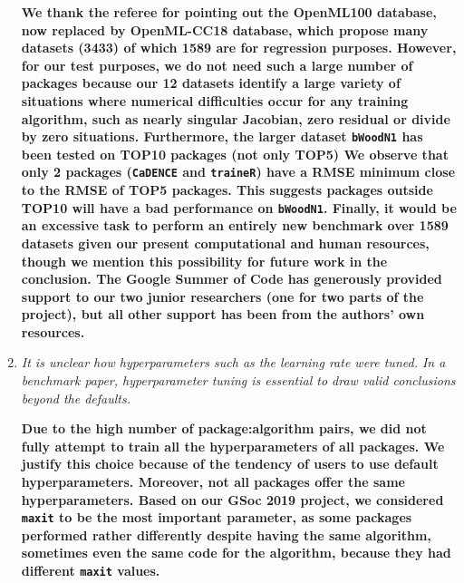 \documentclass[12pt]{article}
\newcommand{\code}{\texttt}
\begin{document}
\begin{enumerate}
\textbf{We thank the referee for pointing out the OpenML100 database, now 
replaced by OpenML-CC18 database, 
which propose many datasets (3433) of which 1589 are for regression purposes.
However, for our test purposes, we do not need such a large number of 
packages because our 12 datasets identify a large variety of situations where 
numerical difficulties occur for any training algorithm, such as nearly singular 
Jacobian, zero residual or divide by zero
situations.
Furthermore, the larger dataset \code{bWoodN1} has been tested on TOP10 packages (not only TOP5)
We observe that only 2 packages (\code{CaDENCE} and \code{traineR}) 
have a RMSE minimum close to the RMSE of TOP5 packages. This suggests packages outside TOP10
will have a bad performance on \code{bWoodN1}. 
Finally, it would be an excessive task to perform an entirely new benchmark over 1589 datasets
given our present computational and human resources, though we mention this possibility 
for future work in the conclusion.
The Google Summer of Code has generously provided support to our two junior researchers
(one for two parts of the project), but all other support has been from the authors' own
resources.}



\item \textit{It is unclear how hyperparameters such as the learning rate were tuned. In a benchmark paper, hyperparameter tuning is essential to draw valid conclusions beyond the defaults.}

\textbf{Due to the high number of package:algorithm pairs, we did not fully attempt to train all the hyperparameters of all packages. 
We justify this choice because of the tendency of users to use default hyperparameters. Moreover, not all packages offer the same hyperparameters. 
Based on our GSoc 2019 project, we considered \code{maxit} to be the most important parameter, as some packages performed rather differently despite 
having the same algorithm, sometimes even the same code for the algorithm, because they had different \code{maxit} values. }


\end{enumerate}
\end{document}
